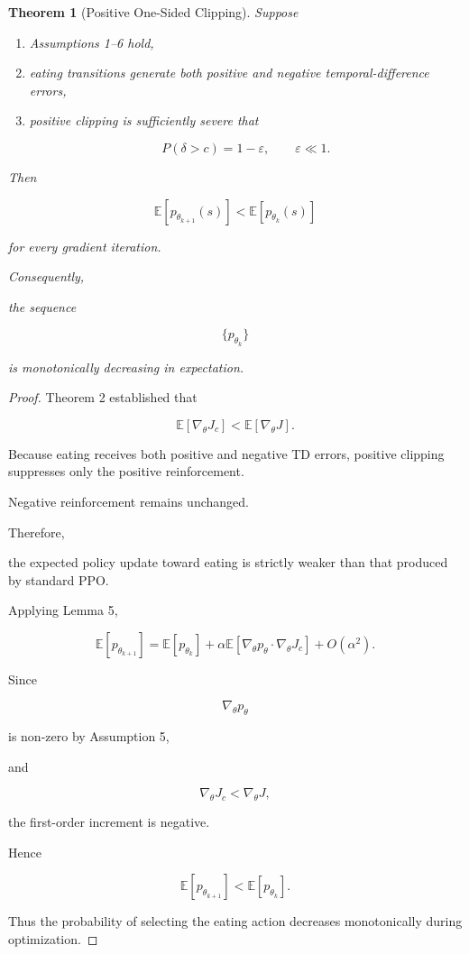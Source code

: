 \documentclass[11pt]{article}
\newtheorem{theorem}{Theorem}
\begin{document}
\begin{theorem}[Positive One-Sided Clipping]

Suppose

\begin{enumerate}

\item Assumptions 1--6 hold,

\item eating transitions generate both positive and negative
temporal-difference errors,

\item positive clipping is sufficiently severe that

\[
P(\delta>c)
=
1-\varepsilon,
\qquad
\varepsilon\ll1.
\]

\end{enumerate}

Then

\[
\mathbb E
[
p_{\theta_{k+1}}(s)
]
<
\mathbb E
[
p_{\theta_k}(s)
]
\]

for every gradient iteration.

Consequently,

the sequence

\[
\{
p_{\theta_k}
\}
\]

is monotonically decreasing in expectation.

\end{theorem}

\begin{proof}

Theorem 2 established that

\[
\mathbb E
[
\nabla_\theta J_c
]
<
\mathbb E
[
\nabla_\theta J
].
\]

Because eating receives both positive and negative TD errors,
positive clipping suppresses only the positive reinforcement.

Negative reinforcement remains unchanged.

Therefore,

the expected policy update toward eating is strictly weaker
than that produced by standard PPO.

Applying Lemma 5,

\[
\mathbb E
[
p_{\theta_{k+1}}
]
=
\mathbb E
[
p_{\theta_k}
]
+
\alpha
\mathbb E
[
\nabla_\theta p_\theta
\cdot
\nabla_\theta J_c
]
+
O(\alpha^2).
\]

Since

\[
\nabla_\theta p_\theta
\]

is non-zero by Assumption 5,

and

\[
\nabla_\theta J_c
<
\nabla_\theta J,
\]

the first-order increment is negative.

Hence

\[
\boxed{
\mathbb E
[
p_{\theta_{k+1}}
]
<
\mathbb E
[
p_{\theta_k}
].
}
\]

Thus the probability of selecting the eating action decreases
monotonically during optimization.

\end{proof}
\end{document}

